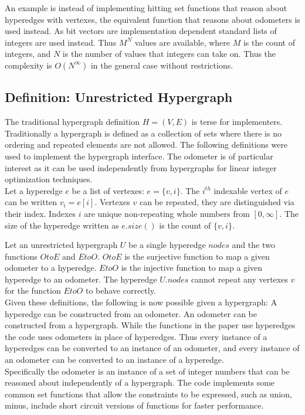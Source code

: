 \documentclass[10pt]{article}
\begin{document}
An example is instead of implementing hitting set functions that reason about hyperedges with vertexes, the equivalent function that reasons about odometers is used instead. As bit vectors are implementation dependent standard lists of integers are used instead. Thus $M^N$ values are available, where $M$ is the count of integers, and $N$ is the number of values that integers can take on. Thus the complexity is $O(N^\infty)$ in the general case without restrictions. 




\subsection{Definition: Unrestricted Hypergraph}
The traditional hypergraph definition $H=(V,E)$ is terse for implementers. Traditionally a hypergraph is defined as a collection of sets where there is no ordering and repeated elements are not allowed. The following definitions were used  to implement the hypergraph interface. The odometer is of particular interest as it can be used independently from hypergraphs for linear integer optimization techniques.\\

Let a hyperedge $e$ be a list of vertexes: $e =\{v,i\}$. The $i^{th}$ indexable vertex of $e$ can be written $v_i = e[i]$. Vertexes $v$ can be repeated, they are distinguished via their index. Indexes $i$ are unique non-repeating whole numbers from $[0,\infty]$. The size of the hyperedge written as $e.size()$ is the count of $\{v,i\}$.


Let an unrestricted hypergraph $U$ be a single hyperedge $nodes$ and the two functions $OtoE$ and $EtoO$. $OtoE$ is the surjective function to map a given odometer to a hyperedge. $EtoO$ is the injective function to map a given hyperedge to an odometer. The hyperedge $U.nodes$ cannot repeat any vertexes $v$ for the function $EtoO$ to behave correctly. \\

Given these definitions, the following is now possible given a hypergraph: A hyperedge can be constructed from an odometer. An odometer can be constructed from a hypergraph. While the functions in the paper use hyperedges the code uses odometers in place of hyperedges. Thus every instance of a hyperedges can be converted to an instance of an odometer, and every instance of an odometer can be converted to an instance of a hyperedge.\\

Specifically the odometer is an instance of a set of integer numbers that can be reasoned about independently of a hypergraph. The code implements some common set functions that allow the constraints to be expressed, such as union, minus, include short circuit versions of functions for faster performance. 
\end{document}
